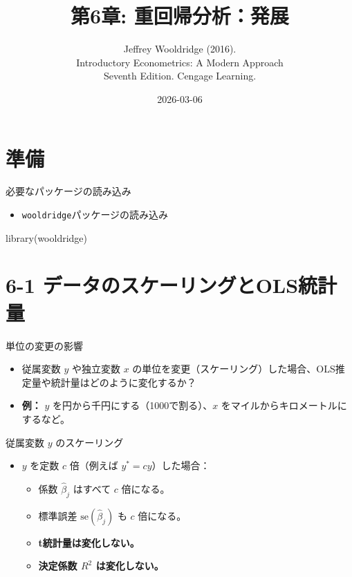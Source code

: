 \documentclass[
  ignorenonframetext,
]{beamer}
\title{第6章: 重回帰分析：発展}
\subtitle{Jeffrey Wooldridge (2016).\\
Introductory Econometrics: A Modern Approach\\
Seventh Edition. Cengage Learning.}
\author{}
\date{\vspace{-2.5em}2026-03-06}
\newenvironment{Shaded}{\begin{snugshade}}{\end{snugshade}}
\newcommand{\FunctionTok}[1]{\textcolor[rgb]{0.00,0.00,0.00}{#1}}
\newcommand{\NormalTok}[1]{#1}
\providecommand{\tightlist}{%
  \setlength{\itemsep}{0pt}\setlength{\parskip}{0pt}}
\begin{document}
\frame{\titlepage}

\hypertarget{ux6e96ux5099}{%
\section{準備}\label{ux6e96ux5099}}

\begin{frame}[fragile]{必要なパッケージの読み込み}
\protect\hypertarget{ux5fc5ux8981ux306aux30d1ux30c3ux30b1ux30fcux30b8ux306eux8aadux307fux8fbcux307f}{}
\begin{itemize}
\tightlist
\item
  \texttt{wooldridge}パッケージの読み込み
\end{itemize}

\begin{Shaded}
\begin{Highlighting}[]
\FunctionTok{library}\NormalTok{(wooldridge)}
\end{Highlighting}
\end{Shaded}
\end{frame}

\hypertarget{ux30c7ux30fcux30bfux306eux30b9ux30b1ux30fcux30eaux30f3ux30b0ux3068olsux7d71ux8a08ux91cf}{%
\section{6-1
データのスケーリングとOLS統計量}\label{ux30c7ux30fcux30bfux306eux30b9ux30b1ux30fcux30eaux30f3ux30b0ux3068olsux7d71ux8a08ux91cf}}

\begin{frame}{単位の変更の影響}
\protect\hypertarget{ux5358ux4f4dux306eux5909ux66f4ux306eux5f71ux97ff}{}
\begin{itemize}
\tightlist
\item
  従属変数 \(y\) や独立変数 \(x\)
  の単位を変更（スケーリング）した場合、OLS推定量や統計量はどのように変化するか？
\item
  \textbf{例：} \(y\) を円から千円にする（1000で割る）、\(x\)
  をマイルからキロメートルにするなど。
\end{itemize}
\end{frame}

\begin{frame}{従属変数 \(y\) のスケーリング}
\protect\hypertarget{ux5f93ux5c5eux5909ux6570-y-ux306eux30b9ux30b1ux30fcux30eaux30f3ux30b0}{}
\begin{itemize}
\tightlist
\item
  \(y\) を定数 \(c\) 倍（例えば \(y^* = cy\)）した場合：

  \begin{itemize}
  \tightlist
  \item
    係数 \(\hat{\beta}_j\) はすべて \(c\) 倍になる。
  \item
    標準誤差 \(\text{se}(\hat{\beta}_j)\) も \(c\) 倍になる。
  \item
    \textbf{t統計量は変化しない。}
  \item
    \textbf{決定係数 \(R^2\) は変化しない。}
  \end{itemize}
\end{itemize}
\end{frame}
\end{document}
